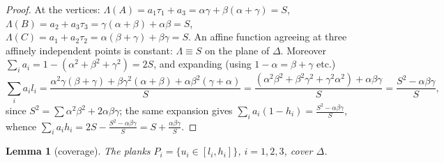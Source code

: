 \documentclass[11pt,reqno]{amsart}
\theoremstyle{plain}
\newtheorem{lemma}[theorem]{Lemma}
\theoremstyle{definition}
\theoremstyle{remark}
\begin{document}
\begin{proof}
At the vertices:
$\Lambda(A)=a_1\tau_1+a_3=\alpha\gamma+\beta(\alpha+\gamma)=S$,
$\Lambda(B)=a_2+a_3\tau_3=\gamma(\alpha+\beta)+\alpha\beta=S$,
$\Lambda(C)=a_1+a_2\tau_2=\alpha(\beta+\gamma)+\beta\gamma=S$. An affine
function agreeing at three affinely independent points is constant:
$\Lambda\equiv S$ on the plane of $\Delta$. Moreover
$\sum_ia_i=1-(\alpha^2+\beta^2+\gamma^2)=2S$, and expanding (using
$1-\alpha=\beta+\gamma$ etc.)
\[
\textstyle\sum_i a_il_i
=\frac{\alpha^2\gamma(\beta+\gamma)+\beta\gamma^2(\alpha+\beta)
+\alpha\beta^2(\gamma+\alpha)}{S}
=\frac{(\alpha^2\beta^2+\beta^2\gamma^2+\gamma^2\alpha^2)+\alpha\beta\gamma}{S}
=\frac{S^2-\alpha\beta\gamma}{S},
\]
since $S^2=\sum\alpha^2\beta^2+2\alpha\beta\gamma$; the same expansion gives
$\sum_ia_i(1-h_i)=\frac{S^2-\alpha\beta\gamma}S$, whence
$\sum_ia_ih_i=2S-\frac{S^2-\alpha\beta\gamma}S=S+\frac{\alpha\beta\gamma}S$.
\end{proof}

\begin{lemma}[coverage]\label{lem:coverage}
The planks $P_i=\{u_i\in[l_i,h_i]\}$, $i=1,2,3$, cover $\Delta$.
\end{lemma}
\end{document}

